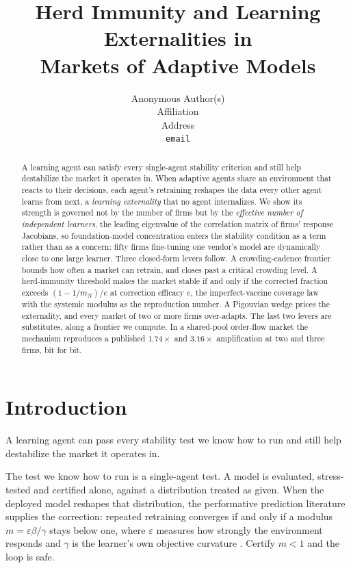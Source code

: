 \documentclass{article}
\title{Herd Immunity and Learning Externalities in\\ Markets of Adaptive Models}
\author{%
  Anonymous Author(s) \\
  Affiliation \\
  Address \\
  \texttt{email} \\
}
\theoremstyle{plain}
\theoremstyle{definition}
\newcommand{\mN}{m_N}
\begin{document}
\maketitle

\begin{abstract}
A learning agent can satisfy every single-agent stability criterion and still help destabilize the market it operates in. When adaptive agents share an environment that reacts to their decisions, each agent's retraining reshapes the data every other agent learns from next, a \emph{learning externality} that no agent internalizes. We show its strength is governed not by the number of firms but by the \emph{effective number of independent learners}, the leading eigenvalue of the correlation matrix of firms' response Jacobians, so foundation-model concentration enters the stability condition as a term rather than as a concern: fifty firms fine-tuning one vendor's model are dynamically close to one large learner. Three closed-form levers follow. A crowding-cadence frontier bounds how often a market can retrain, and closes past a critical crowding level. A herd-immunity threshold makes the market stable if and only if the corrected fraction exceeds $(1-1/\mN)/e$ at correction efficacy $e$, the imperfect-vaccine coverage law with the systemic modulus as the reproduction number. A Pigouvian wedge prices the externality, and every market of two or more firms over-adapts. The last two levers are substitutes, along a frontier we compute. In a shared-pool order-flow market the mechanism reproduces a published $1.74\times$ and $3.16\times$ amplification at two and three firms, bit for bit.
\end{abstract}

\section{Introduction}

A learning agent can pass every stability test we know how to run and still help destabilize the market it operates in.

The test we know how to run is a single-agent test. A model is evaluated, stress-tested and certified alone, against a distribution treated as given. When the deployed model reshapes that distribution, the performative prediction literature supplies the correction: repeated retraining converges if and only if a modulus $m = \varepsilon\beta/\gamma$ stays below one, where $\varepsilon$ measures how strongly the environment responds and $\gamma$ is the learner's own objective curvature \citep{perdomo2020}. Certify $m<1$ and the loop is safe.
\end{document}
